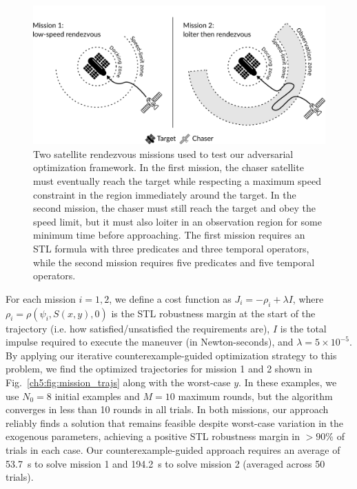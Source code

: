 \begin{figure}[t]
    \centering
    \includegraphics[width=0.7\linewidth]{images/ch5/satellite_missions.png}
    \caption{Two satellite rendezvous missions used to test our adversarial optimization framework. In the first mission, the chaser satellite must eventually reach the target while respecting a maximum speed constraint in the region immediately around the target. In the second mission, the chaser must still reach the target and obey the speed limit, but it must also loiter in an observation region for some minimum time before approaching. The first mission requires an STL formula with three predicates and three temporal operators, while the second mission requires five predicates and five temporal operators.}
    \label{ch5:fig:mission_specs}
\end{figure}

For each mission $i=1, 2$, we define a cost function as $J_i = -\rho_i + \lambda I$, where $\rho_i = \rho(\psi_i, S(x, y), 0)$ is the STL robustness margin at the start of the trajectory (i.e. how satisfied/unsatisfied the requirements are), $I$ is the total impulse required to execute the maneuver (in Newton-seconds), and $\lambda = 5\times10^{-5}$. By applying our iterative counterexample-guided optimization strategy to this problem, we find the optimized trajectories for mission 1 and 2 shown in Fig.~\ref{ch5:fig:mission_trajs} along with the worst-case $y$. In these examples, we use $N_0=8$ initial examples and $M=10$ maximum rounds, but the algorithm converges in less than 10 rounds in all trials. In both missions, our approach reliably finds a solution that remains feasible despite worst-case variation in the exogenous parameters, achieving a positive STL robustness margin in $>90\%$ of trials in each case. Our counterexample-guided approach requires an average of \SI{53.7}{s} to solve mission 1 and \SI{194.2}{s} to solve mission 2 (averaged across 50 trials).

